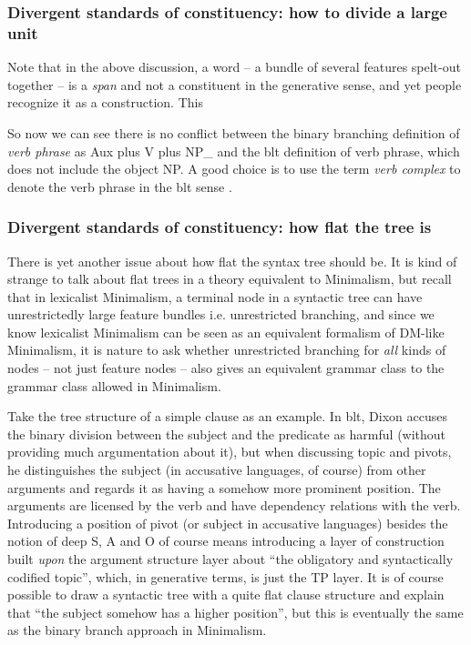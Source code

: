 \documentclass[../main.tex]{subfiles}
\begin{document}
\subsubsection{Divergent standards of constituency: how to divide a large unit}

Note that in the above discussion, a word -- a bundle of several features spelt-out together -- 
is a \emph{span} and not a constituent in the generative sense, 
and yet people recognize it as a construction. 
This %

So now we can see there is no conflict 
between the binary branching definition of \emph{verb phrase} as Aux plus V plus NP_{} 
and the \ac{blt} definition of verb phrase, which does not include the object NP. 
A good choice is to use the term \emph{verb complex} to denote the verb phrase in the \ac{blt} sense \citep[among others]{Wilbur2014,Friesen2017}.

\subsubsection{Divergent standards of constituency: how flat the tree is}

There is yet another issue about how flat the syntax tree should be. 
It is kind of strange to talk about flat trees in a theory equivalent to Minimalism, 
but recall that in lexicalist Minimalism, 
a terminal node in a syntactic tree can have unrestrictedly large feature bundles i.e. unrestricted branching, 
and since we know lexicalist Minimalism can be seen as an equivalent formalism of DM-like Minimalism, 
it is nature to ask whether unrestricted branching for \emph{all} kinds of nodes 
-- not just feature nodes -- also gives an equivalent grammar class to the grammar class allowed in Minimalism.

Take the tree structure of a simple clause as an example. 
In \ac{blt}, Dixon accuses the binary division between 
the subject and the predicate as harmful (without providing much argumentation about it), but when discussing 
topic and pivots, he distinguishes the subject (in accusative languages, of course) from other arguments and regards it as having a somehow more 
prominent position. The arguments are licensed by the verb and have dependency relations with the verb. 
Introducing a position of pivot (or subject in accusative languages) besides the notion of deep S, A and O 
of course means introducing a layer of construction built \emph{upon} the argument structure layer
about ``the obligatory and syntactically codified topic'', 
which, in generative terms, is just the TP layer. It is of course possible to draw a syntactic tree 
with a quite flat clause structure and explain that ``the subject somehow has a higher position'', 
but this is eventually the same as the binary branch approach in Minimalism.
\end{document}
